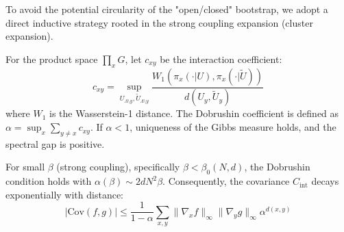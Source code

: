 To avoid the potential circularity of the "open/closed" bootstrap, we adopt a direct inductive strategy rooted in the strong coupling expansion (cluster expansion).

\begin{definition}
For the product space $\prod_x G$, let $c_{xy}$ be the interaction coefficient:
\begin{equation}
c_{xy} = \sup_{U_{\Lambda \setminus y}, \tilde{U}_{\Lambda \setminus y}} \frac{W_1(\pi_x(\cdot | U), \pi_x(\cdot | \tilde{U}))}{d(U_y, \tilde{U}_y)}
\end{equation}
where $W_1$ is the Wasserstein-1 distance. The Dobrushin coefficient is defined as $\alpha = \sup_x \sum_{y \ne x} c_{xy}$.
If $\alpha < 1$, uniqueness of the Gibbs measure holds, and the spectral gap is positive.
\end{definition}

\begin{theorem}
\label{thm:rigorous-decay}
For small $\beta$ (strong coupling), specifically $\beta < \beta_0(N, d)$, the Dobrushin condition holds with $\alpha(\beta) \sim 2 d N^2 \beta$.
Consequently, the covariance $C_{\mathrm{int}}$ decays exponentially with distance:
\begin{equation}
|\mathrm{Cov}(f, g)| \le \frac{1}{1-\alpha} \sum_{x,y} \|\nabla_x f\|_\infty \|\nabla_y g\|_\infty \alpha^{d(x,y)}
\end{equation}
\end{theorem}

